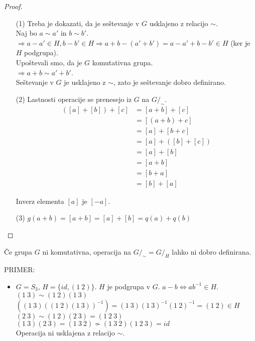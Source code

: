 \documentclass[a4paper,12pt]{article}
\begin{document}
\newpage 

\begin{proof} ~
\begin{enumerate}
\item[(1)] Treba je dokazati, da je seštevanje v $G$ usklajeno z relacijo $\sim$. \\

Naj bo $a\sim a'$ in $b\sim b'$. \\

$\Rightarrow a-a'\in H,b-b'\in H \Rightarrow a+b-(a'+b')=a-a'+b-b'\in H$ (ker je $H$ podgrupa). \\

Upoštevali smo, da je $G$ komutativna grupa.\\

$\Rightarrow a+b \sim a'+b'$. \\

Seštevanje v $G$ je usklajeno z $\sim$, zato je seštevanje dobro definirano. 
\item[(2)] Lastnosti operacije se prenesejo iz $G$ na $G/_\sim$. 
\begin{align*}
([a]+[b])+[c] & =[a+b]+[c] \\ 
& = [(a+b)+c] \\
& =[a]+[b+c] \\
& = [a]+([b]+[c]) \\ 
& = [a]+[b] \\
& =[a+b] \\
& = [b+a] \\ 
& =[b]+[a]
\end{align*}

Inverz elementa $[a]$ je $[-a]$.
\item[(3)] $g(a+b)=[a+b]=[a]+[b]=q(a)+q(b)$\\
\end{enumerate}
\end{proof}

Če grupa $G$ ni komutativna, operacija na $G/_\sim=G/_H$ lahko ni dobro definirana. \\

\newpage 

PRIMER: 
\begin{itemize}
\item $G=S_3$, $H=\{id,(1~2)\}$. $H$ je podgrupa v $G$. $a-b \Leftrightarrow ab^{-1}\in H$. \\

$(1~3)\sim(1~2)(1~3)$ \\

$((1~3)((1~2)(1~3))^{-1})=(1~3)(1~3)^{-1}(1~2)^{-1}=(1~2)\in H$\\

$(2~3)\sim(1~2)(2~3)=(1~2~3)$ \\

$(1~3)(2~3)=(1~3~2) \not \sim (1~3~2)(1~2~3)=id$ \\

Operacija ni usklajena z relacijo $\sim$. \\
\end{itemize}
\end{document}

